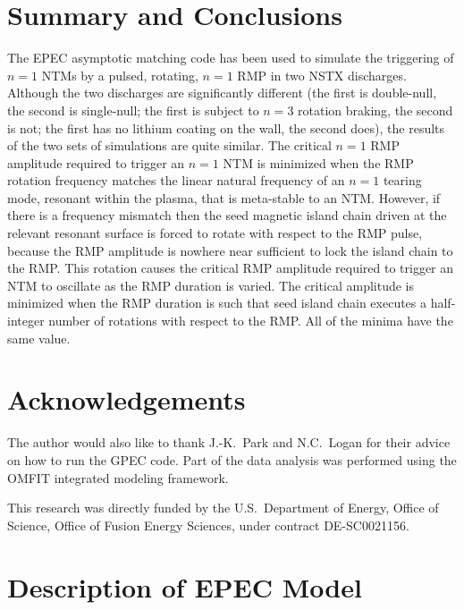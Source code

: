 \documentclass[12pt,prb,aps]{revtex4-1}
\begin{document}
\section{Summary and Conclusions}
The EPEC asymptotic matching code has been used to simulate the triggering of $n=1$ NTMs by a
pulsed, rotating, $n=1$ RMP  in
two NSTX discharges. Although the two discharges are significantly different (the first is double-null, the second is single-null;
the first is subject to $n=3$ rotation braking, the second is not; the first has no lithium coating on the wall, the
second does), the results of the two sets of simulations are quite similar. The critical $n=1$ RMP  amplitude required to
trigger an $n=1$ NTM is minimized when the RMP rotation frequency matches the linear natural frequency of an $n=1$ tearing mode, resonant within the plasma, that is meta-stable to an NTM. However, if there is a frequency mismatch then the seed magnetic island chain driven at the relevant resonant surface is forced to rotate with respect to the RMP pulse, because the RMP amplitude is nowhere near sufficient to lock the island chain to the RMP. 
This rotation causes the critical RMP amplitude required to trigger an NTM to oscillate as the RMP duration is varied. The critical amplitude is
minimized when the RMP duration is such that  seed island chain executes a half-integer number of rotations with respect to the RMP. All of the minima have the same value. 

\section*{Acknowledgements}
The author would also
like to thank J.-K.~Park and N.C.~Logan for their advice on how to run the GPEC code. Part of the data analysis was performed using
the OMFIT integrated modeling framework.\cite{omfit}

This research was directly funded by the U.S.\ Department of Energy, Office of Science, Office of Fusion Energy Sciences, under  contract DE-SC0021156. 

\appendix
\section{Description of EPEC Model}\label{epec}
\end{document}
